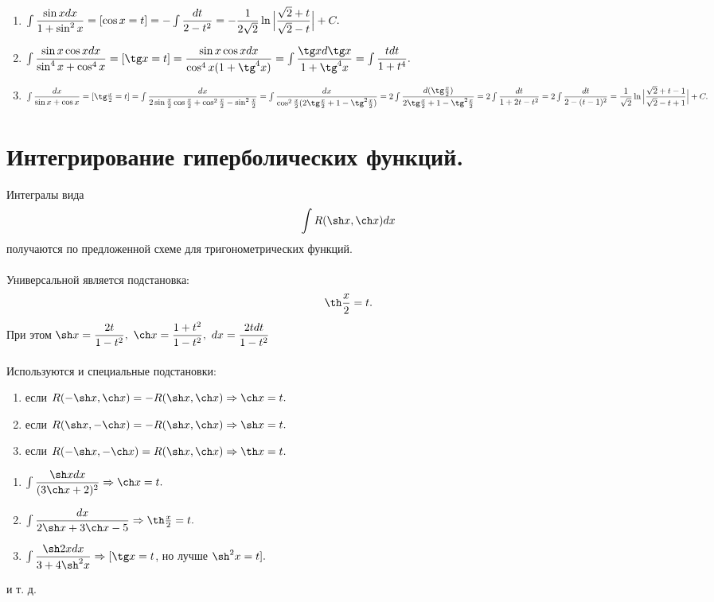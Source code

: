 \begin{example}
	\begin{enumerate}
		\item $\int \dfrac{\sin x dx}{1+\sin^2x} = [\cos x=t] = -\int \dfrac{dt}{2-t^2} = -\dfrac{1}{2\sqrt{2}}\ln\Big|\dfrac{\sqrt{2}+t}{\sqrt{2}-t}\Big| + C.$
		\item $\int \dfrac{\sinx\cos xdx}{\sin^4x+\cos^4x} = [\tg x = t] = \dfrac{\sinx \cos xdx}{\cos^4x(1+\tg^4x)} = \int \dfrac{\tg xd\tg x}{1+\tg^4x} = \int \dfrac{tdt}{1+t^4}.$
		\item $\int \dfrac{dx}{\sinx+\cos x} = [\tg\frac{x}{2} = t] = \int \dfrac{dx}{2\sin\frac{x}{2}\cos\frac{x}{2}+\cos^2\frac{x}{2}-\sin^2\frac{x}{2}} = \int \dfrac{dx}{\cos^2\frac{x}{2}(2\tg\frac{x}{2}+1-\tg^2\frac{x}{2})} = 2 \int \dfrac{d(\tg\frac{x}{2})}{2\tg\frac{x}{2}+1-\tg^2\frac{x}{2}} = 2 \int \dfrac{dt}{1+2t-t^2} = 2 \int \dfrac{dt}{2-(t-1)^2}= \dfrac{1}{\sqrt{2}} \ln\Big|\dfrac{\sqrt{2}+t-1}{\sqrt{2}-t+1}\Big| + C.$
	\end{enumerate}
\end{example}
\section{Интегрирование гиперболических функций.}
Интегралы вида $$\int R(\sh x, \ch x)dx$$ получаются по предложенной схеме для тригонометрических функций.\\\\
Универсальной является подстановка:
$$\th\frac{x}{2} = t.$$
При этом $\sh x = \dfrac{2t}{1-t^2},\  \ch x = \dfrac{1+t^2}{1-t^2},\  dx = \dfrac{2tdt}{1-t^2} $\\\\
Используются и специальные подстановки:
\begin{enumerate}
	\item если $R(-\sh x, \ch x) = -R(\sh x, \ch x) \Rightarrow \ch x = t .$
	\item если $R(\sh x, -\ch x) = -R(\sh x, \ch x) \Rightarrow \sh x = t .$
	\item если $R(-\sh x, -\ch x) = R(\sh x, \ch x) \Rightarrow \th x = t .$
\end{enumerate}
\begin{example}
	\begin{enumerate}
		\item $\int \dfrac{\sh xdx}{(3\ch x+2)^2} \Rightarrow \ch x = t.$
		\item $\int \dfrac{dx}{2\sh x+3\ch x-5} \Rightarrow \th\frac{x}{2} = t.$
		\item $\int \dfrac{\sh2xdx}{3+4\sh^2x} \Rightarrow [\tg x = t$, но лучше $\sh^2x = t].$
	\end{enumerate}
	и т. д.
\end{example}